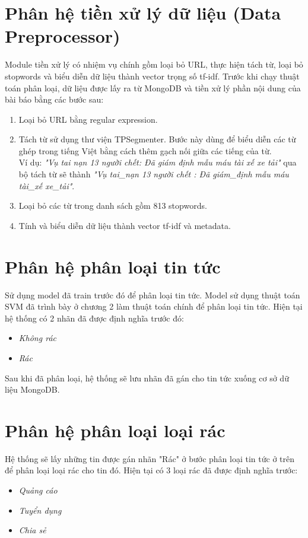\section{Phân hệ tiền xử lý dữ liệu (Data Preprocessor)}
\label{sec:DataPreprocessor}
Module tiền xử lý có nhiệm vụ chính gồm loại bỏ URL, thực hiện tách từ, loại bỏ stopwords và biểu diễn dữ liệu thành vector trọng số tf-idf. Trước khi chạy thuật toán phân loại, dữ liệu được lấy ra từ MongoDB và tiền xử lý phần nội dung của bài báo bằng các bước sau:
	\begin{enumerate}
		\item Loại bỏ URL bằng regular expression.
		\item Tách từ sử dụng thư viện TPSegmenter. Bước này dùng để biểu diễn các từ ghép trong tiếng Việt bằng cách thêm gạch nối giữa các tiếng của từ.\\
		Ví dụ: \textit{"Vụ tai nạn 13 người chết: Đã giám định mẫu máu tài xế xe tải"} qua bộ tách từ sẽ thành \textit{"Vụ tai\_nạn 13 người chết : Đã giám\_định mẫu máu tài\_xế xe\_tải"}.
		\item Loại bỏ các từ trong danh sách gồm 813 stopwords.
		\item Tính và biểu diễn dữ liệu thành vector tf-idf và metadata.
	\end{enumerate}

\section{Phân hệ phân loại tin tức}
\label{sec:newsClassify}
Sử dụng model đã train trước đó để phân loại tin tức. Model sử dụng thuật toán SVM đã trình bày ở chương 2 làm thuật toán chính để phân loại tin tức. Hiện tại hệ thống có 2 nhãn đã được định nghĩa trước đó:
	\begin{itemize}
    \item \textit{Không rác}
    \item \textit{Rác}
	\end{itemize}

Sau khi đã phân loại, hệ thống sẽ lưu nhãn đã gán cho tin tức xuống cơ sở dữ liệu MongoDB.

\section{Phân hệ phân loại loại rác}
\label{sec:spamCategory}
Hệ thống sẽ lấy những tin được gán nhãn "Rác" ở bước phân loại tin tức ở trên để phân loại loại rác cho tin đó. Hiện tại có 3 loại rác đã được định nghĩa trước:
\begin{itemize}
  \item \textit{Quảng cáo}
  \item \textit{Tuyển dụng}
  \item \textit{Chia sẻ}
\end{itemize}

